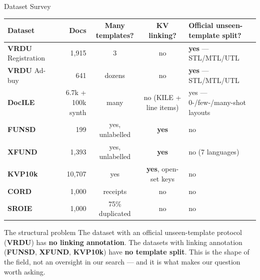 \documentclass[aspectratio=169, 11pt]{beamer}
\begin{document}
\begin{frame}{Dataset Survey}
  \scriptsize
  \begin{tabular}{@{}lrccp{3.3cm}@{}}
    \toprule
    \textbf{Dataset} & \textbf{Docs} & \textbf{Many templates?} & \textbf{KV linking?} & \textbf{Official unseen-template split?}\\
    \midrule
    \textbf{VRDU} Registration & 1,915 & 3 & no & \textcolor{good}{\textbf{yes} — STL/MTL/UTL}\\
    \textbf{VRDU} Ad-buy & 641 & dozens & no & \textcolor{good}{\textbf{yes} — STL/MTL/UTL}\\
    \textbf{DocILE} & 6.7k + 100k synth & many & no (KILE + line items) & \textcolor{good}{yes} — 0-/few-/many-shot layouts\\
    \textbf{FUNSD} & 199 & yes, unlabelled & \textcolor{good}{\textbf{yes}} & no\\
    \textbf{XFUND} & 1,393 & yes, unlabelled & \textcolor{good}{\textbf{yes}} & no (7 languages)\\
    \textbf{KVP10k} & 10,707 & yes & \textcolor{good}{\textbf{yes}, open-set keys} & no\\
    \textbf{CORD} & 1,000 & receipts & no & no\\
    \textbf{SROIE} & 1,000 & \textcolor{warn}{75\% duplicated} & no & no\\
    \bottomrule
  \end{tabular}

  \smallskip
  \begin{alertblock}{The structural problem}
    \footnotesize The dataset with an official unseen-template protocol (\textbf{VRDU}) has \textbf{no
    linking annotation}. The datasets with linking annotation (\textbf{FUNSD}, \textbf{XFUND},
    \textbf{KVP10k}) have \textbf{no template split}. This is the shape of the field, not an
    oversight in our search — and it is what makes our question worth asking.
  \end{alertblock}
\end{frame}
\end{document}
